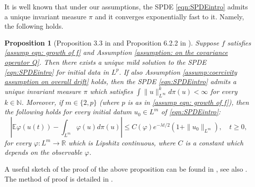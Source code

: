 \documentclass[reqno, 11pt]{amsart}
\theoremstyle{plain}
\newtheorem{theorem}{Theorem}[section]
\newtheorem{proposition}[theorem]{Proposition}
\theoremstyle{definition}
\theoremstyle{remark}
\numberwithin{equation}{section}
\numberwithin{theorem}{section}
\DeclareMathOperator{\dist}{dist}
\newcommand{\R}{\mathbb{R}}
\newcommand{\N}{\mathbb{N}}
\begin{document}
{%


It is well known that under our assumptions, the SPDE \eqref{eqn:SPDEintro} admits a unique invariant measure $\pi$ and it converges exponentially fast to it. Namely, the following holds. 
\begin{proposition}[Proposition 3.3 in \cite{brehier2022approximation} and Proposition 6.2.2 in \cite{Cerrai01}]\label{prop:exponential convergence of SPDE}
Suppose $f$ satisfies \eqref{assump eqn: growth of f} and Assumption \ref{assumption: on the covariance operator Q}. Then there exists a unique mild solution to the SPDE \eqref{eqn:SPDEintro} for initial data in $L^p$. 
    If also  Assumption \ref{assump:coercivity assumption on overall drift} holds,  then the SPDE \eqref{eqn:SPDEintro} admits a unique invariant measure $\pi$ which satisfies $\int \|u\|_{L^{\infty}}^k d\pi(u)< \infty$ for every $k \in \N$. Moreover, if $m \in \{2,p\}$ (where $p$ is as in  \eqref{assump eqn: growth of f}), then the following holds for every initial datum $u_0 \in L^m$ of \eqref{eqn:SPDEintro}: 
    $$
    \left \vert \mathbb E \varphi(u(t)) - \int_{L^{m}} \varphi(u) d\pi(u) \right \vert \leq  C(\varphi) e^{-\lambda t/2 } (1+\|u_0\|_{L^m}), \quad t\geq 0, 
    $$
    for every $\varphi:L^m\rightarrow \R$  which is Lipshitz continuous,  where $C$ is a constant which depends on the observable $\varphi$. 
\end{proposition}
A useful sketch of the proof of the above proposition can be found in \cite[Section 3]{brehier2022approximation}, see also \cite[Theorem 3.5.5]{berglund2019introduction}. The method of proof is detailed in  \cite[Theorem 6.3.3 and Chapter 4]{da1996ergodicity}. 










}
\end{document}
